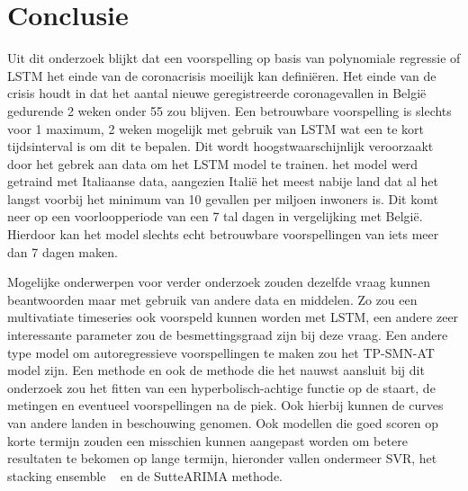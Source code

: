 
\chapter{Conclusie}
\label{ch:conclusie}


Uit dit onderzoek blijkt dat een voorspelling op basis van polynomiale regressie of LSTM het einde van de coronacrisis moeilijk kan definiëren. Het einde van de crisis houdt in dat het aantal nieuwe geregistreerde coronagevallen in België gedurende 2 weken onder 55 zou blijven. Een betrouwbare voorspelling is slechts voor 1 maximum, 2 weken mogelijk met gebruik van LSTM wat een te kort tijdsinterval is om dit te bepalen. Dit wordt hoogstwaarschijnlijk veroorzaakt door het gebrek aan data om het LSTM model te trainen. 
het model werd getraind met Italiaanse data, aangezien Italië    het meest nabije land dat al het langst voorbij het minimum van 10 gevallen per miljoen inwoners is. Dit komt neer op een voorloopperiode van een 7 tal dagen in vergelijking met België. Hierdoor kan het model slechts echt betrouwbare voorspellingen van iets meer dan 7 dagen maken.

Mogelijke onderwerpen voor verder onderzoek zouden dezelfde vraag kunnen beantwoorden maar met gebruik van andere data en middelen. Zo zou een multivatiate timeseries ook voorspeld kunnen worden met LSTM, een andere zeer interessante parameter zou de besmettingsgraad zijn bij deze vraag. Een andere type model om autoregressieve voorspellingen te maken zou het TP-SMN-AT model zijn. Een methode en ook de methode die het nauwst aansluit bij dit onderzoek zou het fitten van een hyperbolisch-achtige functie op de staart, de metingen en eventueel voorspellingen na de piek. Ook hierbij kunnen de curves van andere landen in beschouwing genomen. Ook modellen die goed scoren op korte termijn zouden een misschien kunnen aangepast worden om betere resultaten te bekomen op lange termijn, hieronder vallen ondermeer SVR, het stacking ensemble ~\autocite{Ribeiro2020} en de SutteARIMA methode.

